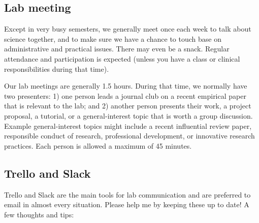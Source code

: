 \documentclass[letterpaper,12pt,oneside]{memoir}
\begin{document}
\subsection{Lab meeting}
Except in very busy semesters, we generally meet once each week to talk about science together, and to make sure we have a chance to touch base on administrative and practical issues. There may even be a snack. Regular attendance and participation is expected (unless you have a class or clinical responsibilities during that time).

Our lab meetings are generally 1.5 hours. During that time, we normally have two presenters: 1) one person leads a journal club on a recent empirical paper that is relevant to the lab; and 2) another person presents their work, a project proposal, a tutorial, or a general-interest topic that is worth a group discussion. Example general-interest topics might include a recent influential review paper, responsible conduct of research, professional development, or innovative research practices. Each person is allowed a maximum of 45 minutes. 


\subsection{Trello and Slack}
Trello and Slack are the main tools for lab communication and are preferred to email in almost every situation. Please help me by keeping these up to date! A few thoughts and tips:
\end{document}
